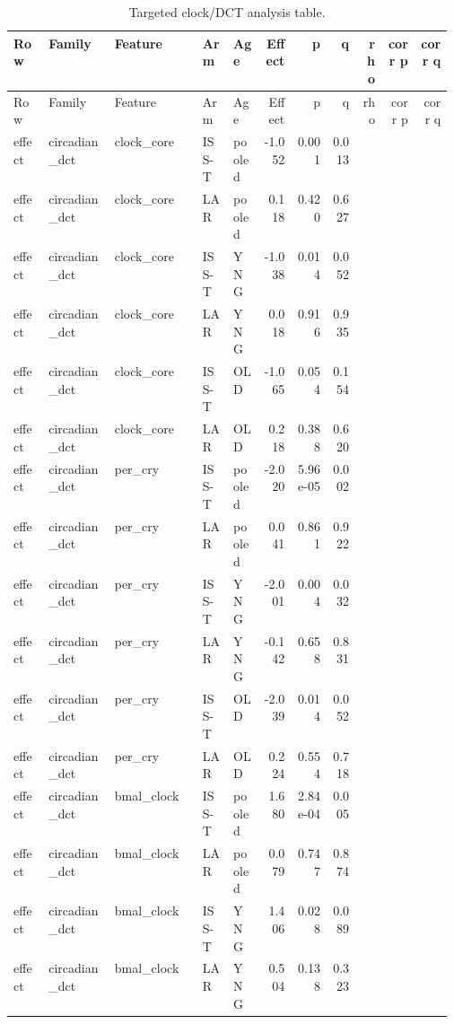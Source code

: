 \documentclass[11pt]{article}
\begin{document}
\begin{landscape}
\scriptsize
\setlength{\tabcolsep}{3pt}
\begin{longtable}{p{0.08\linewidth}p{0.15\linewidth}p{0.20\linewidth}p{0.07\linewidth}p{0.07\linewidth}rrrrrr}
\caption{Targeted clock/DCT analysis table.}\\
\toprule
Row & Family & Feature & Arm & Age & Effect & p & q & rho & corr p & corr q \\
\midrule
\endfirsthead
\toprule
Row & Family & Feature & Arm & Age & Effect & p & q & rho & corr p & corr q \\
\midrule
\endhead
effect & circadian\_dct & clock\_core & ISS-T & pooled & -1.052 & 0.001 & 0.013 &  &  &  \\
effect & circadian\_dct & clock\_core & LAR & pooled & 0.118 & 0.420 & 0.627 &  &  &  \\
effect & circadian\_dct & clock\_core & ISS-T & YNG & -1.038 & 0.014 & 0.052 &  &  &  \\
effect & circadian\_dct & clock\_core & LAR & YNG & 0.018 & 0.916 & 0.935 &  &  &  \\
effect & circadian\_dct & clock\_core & ISS-T & OLD & -1.065 & 0.054 & 0.154 &  &  &  \\
effect & circadian\_dct & clock\_core & LAR & OLD & 0.218 & 0.388 & 0.620 &  &  &  \\
effect & circadian\_dct & per\_cry & ISS-T & pooled & -2.020 & 5.96e-05 & 0.002 &  &  &  \\
effect & circadian\_dct & per\_cry & LAR & pooled & 0.041 & 0.861 & 0.922 &  &  &  \\
effect & circadian\_dct & per\_cry & ISS-T & YNG & -2.001 & 0.004 & 0.032 &  &  &  \\
effect & circadian\_dct & per\_cry & LAR & YNG & -0.142 & 0.658 & 0.831 &  &  &  \\
effect & circadian\_dct & per\_cry & ISS-T & OLD & -2.039 & 0.014 & 0.052 &  &  &  \\
effect & circadian\_dct & per\_cry & LAR & OLD & 0.224 & 0.554 & 0.718 &  &  &  \\
effect & circadian\_dct & bmal\_clock & ISS-T & pooled & 1.680 & 2.84e-04 & 0.005 &  &  &  \\
effect & circadian\_dct & bmal\_clock & LAR & pooled & 0.079 & 0.747 & 0.874 &  &  &  \\
effect & circadian\_dct & bmal\_clock & ISS-T & YNG & 1.406 & 0.028 & 0.089 &  &  &  \\
effect & circadian\_dct & bmal\_clock & LAR & YNG & 0.504 & 0.138 & 0.323 &  &  &  \\

\end{longtable}
\end{landscape}
\end{document}
